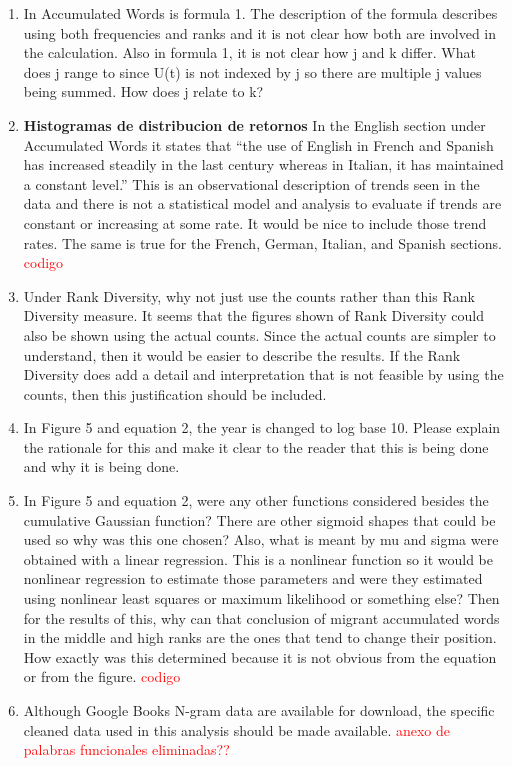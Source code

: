 \documentclass{article}
\begin{document}
\begin{enumerate}
\item  In Accumulated Words is formula 1. The description of the formula
describes using both frequencies and ranks and it is not clear how
both are involved in the calculation. Also in formula 1, it is not
clear how j and k differ. What does j range to since U(t) is not
indexed by j so there are multiple j values being summed. How does j
relate to k?

\item \textbf{Histogramas de distribucion de retornos }In the English section under Accumulated Words it states that “the
use of English in French and Spanish has increased steadily in the
last century whereas in Italian, it has maintained a constant level.”
This is an observational description of trends seen in the data and
there is not a statistical model and analysis to evaluate if trends
are constant or increasing at some rate. It would be nice to include
those trend rates. The same is true for the French, German, Italian,
and Spanish sections. \textcolor{red}{codigo}

\item Under Rank Diversity, why not just use the counts rather than this
Rank Diversity measure. It seems that the figures shown of Rank
Diversity could also be shown using the actual counts. Since the
actual counts are simpler to understand, then it would be easier to
describe the results. If the Rank Diversity does add a detail and
interpretation that is not feasible by using the counts, then this
justification should be included.

\item  In Figure 5 and equation 2, the year is changed to log base 10.
Please explain the rationale for this and make it clear to the reader
that this is being done and why it is being done.

\item  In Figure 5 and equation 2, were any other functions considered
besides the cumulative Gaussian function? There are other sigmoid
shapes that could be used so why was this one chosen? Also, what is
meant by mu and sigma were obtained with a linear regression. This is
a nonlinear function so it would be nonlinear regression to estimate
those parameters and were they estimated using nonlinear least squares
or maximum likelihood or something else? Then for the results of this,
why can that conclusion of migrant accumulated words in the middle and
high ranks are the ones that tend to change their position. How
exactly was this determined because it is not obvious from the
equation or from the figure. \textcolor{red}{codigo}

\item  Although Google Books N-gram data are available for download, the
specific cleaned data used in this analysis should be made available. \textcolor{red}{anexo de palabras funcionales eliminadas??}



\end{enumerate}
\end{document}
